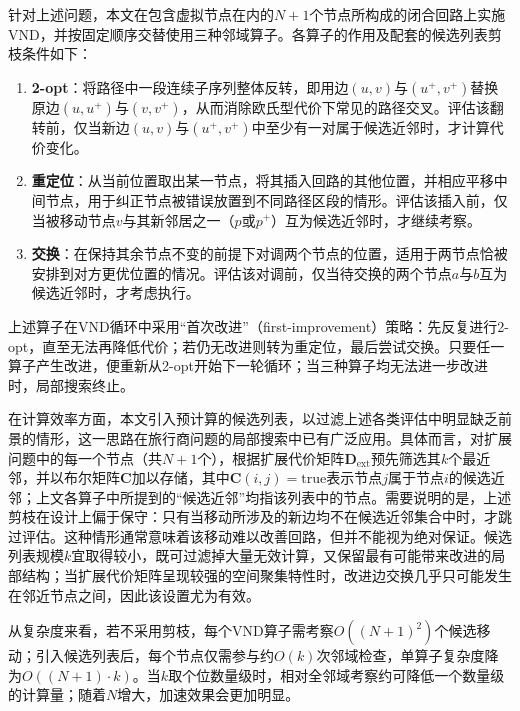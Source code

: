 \documentclass[lettersize,journal]{IEEEtran}
\begin{document}
针对上述问题，本文在包含虚拟节点在内的$N+1$个节点所构成的闭合回路上实施VND，并按固定顺序交替使用三种邻域算子。各算子的作用及配套的候选列表剪枝条件如下：
\begin{enumerate}
\item \textbf{2-opt}：将路径中一段连续子序列整体反转，即用边$(u, v)$与$(u^{+}, v^{+})$替换原边$(u, u^{+})$与$(v, v^{+})$，从而消除欧氏型代价下常见的路径交叉。评估该翻转前，仅当新边$(u, v)$与$(u^{+}, v^{+})$中至少有一对属于候选近邻时，才计算代价变化。
\item \textbf{重定位}：从当前位置取出某一节点，将其插入回路的其他位置，并相应平移中间节点，用于纠正节点被错误放置到不同路径区段的情形。评估该插入前，仅当被移动节点$v$与其新邻居之一（$p$或$p^{+}$）互为候选近邻时，才继续考察。
\item \textbf{交换}：在保持其余节点不变的前提下对调两个节点的位置，适用于两节点恰被安排到对方更优位置的情况。评估该对调前，仅当待交换的两个节点$a$与$b$互为候选近邻时，才考虑执行。
\end{enumerate}
上述算子在VND循环中采用“首次改进”（first-improvement）策略：先反复进行2-opt，直至无法再降低代价；若仍无改进则转为重定位，最后尝试交换。只要任一算子产生改进，便重新从2-opt开始下一轮循环；当三种算子均无法进一步改进时，局部搜索终止。

在计算效率方面，本文引入预计算的候选列表，以过滤上述各类评估中明显缺乏前景的情形，这一思路在旅行商问题的局部搜索中已有广泛应用\cite{ref26}。具体而言，对扩展问题中的每一个节点（共$N+1$个），根据扩展代价矩阵$\mathbf{D}_{\mathrm{ext}}$预先筛选其$k$个最近邻，并以布尔矩阵$\mathbf{C}$加以存储，其中$\mathbf{C}(i,j)=\mathrm{true}$表示节点$j$属于节点$i$的候选近邻；上文各算子中所提到的“候选近邻”均指该列表中的节点。需要说明的是，上述剪枝在设计上偏于保守：只有当移动所涉及的新边均不在候选近邻集合中时，才跳过评估。这种情形通常意味着该移动难以改善回路，但并不能视为绝对保证。候选列表规模$k$宜取得较小，既可过滤掉大量无效计算，又保留最有可能带来改进的局部结构；当扩展代价矩阵呈现较强的空间聚集特性时，改进边交换几乎只可能发生在邻近节点之间，因此该设置尤为有效。

从复杂度来看，若不采用剪枝，每个VND算子需考察$O((N+1)^2)$个候选移动；引入候选列表后，每个节点仅需参与约$O(k)$次邻域检查，单算子复杂度降为$O((N+1)\cdot k)$。当$k$取个位数量级时，相对全邻域考察约可降低一个数量级的计算量；随着$N$增大，加速效果会更加明显。
\end{document}
